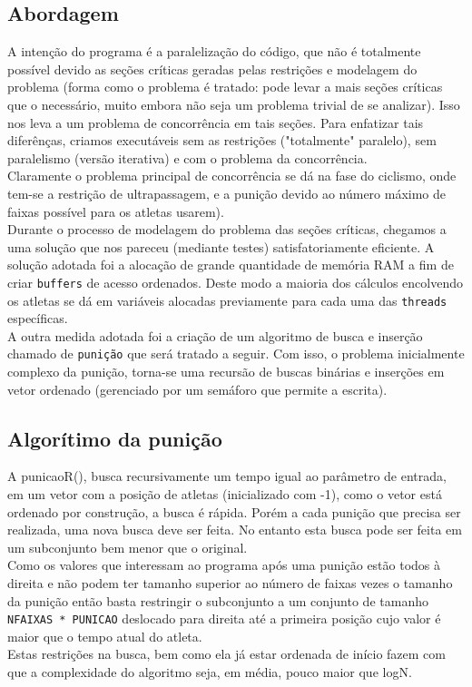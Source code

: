 \documentclass[12pt,a4paper]{article}
\begin{document}
\subsection{Abordagem}

A intenção do programa é a paralelização do código, que não é totalmente 
possível devido as seções críticas geradas pelas restrições e modelagem do 
problema (forma como o problema é tratado: pode levar a mais seções críticas 
que o necessário, muito embora não seja um problema trivial de se analizar). Isso
nos leva a um problema de concorrência em tais seções. Para enfatizar tais 
diferênças, criamos executáveis sem as restrições ("totalmente" paralelo), sem 
paralelismo (versão iterativa) e com o problema da concorrência. \\
Claramente o problema principal de concorrência se dá na fase do ciclismo,
onde tem-se a restrição de ultrapassagem, e a punição devido ao número máximo de
faixas possível para os atletas usarem). \\
Durante o processo de modelagem do problema das seções críticas, chegamos a 
uma solução que nos pareceu (mediante testes) satisfatoriamente eficiente.
A solução adotada foi a alocação de grande quantidade de memória RAM a fim de
criar \verb+buffers+ de acesso ordenados. Deste modo a maioria dos cálculos encolvendo
os atletas se dá em variáveis alocadas previamente para cada uma das \verb+threads+
específicas. \\
A outra medida adotada foi a criação de um algoritmo de busca e inserção
chamado de \verb+punição+ que será tratado a seguir. Com isso, o problema inicialmente
complexo da punição, torna-se uma recursão de buscas binárias e inserções em vetor
ordenado (gerenciado por um semáforo que permite a escrita).

\subsection{Algorítimo da punição}

A punicaoR(), busca recursivamente um tempo igual ao parâmetro de entrada, em um vetor
com a posição de atletas (inicializado com -1), como o vetor está ordenado por
construção, a busca é rápida. Porém a cada punição que precisa ser realizada, uma nova
busca deve ser feita. No entanto esta busca pode ser feita em um subconjunto bem menor
que o original. \\
Como os valores que interessam ao programa após uma punição estão todos à direita
e não podem ter tamanho superior ao número de faixas vezes o tamanho da punição então
basta restringir o subconjunto a um conjunto de tamanho \verb+NFAIXAS * PUNICAO+ deslocado
para direita até a primeira posição cujo valor é maior que o tempo atual do atleta. \\ 
Estas restrições na busca, bem como ela já estar ordenada de início fazem com que a complexidade
do algoritmo seja, em média, pouco maior que logN.\\
\end{document}

